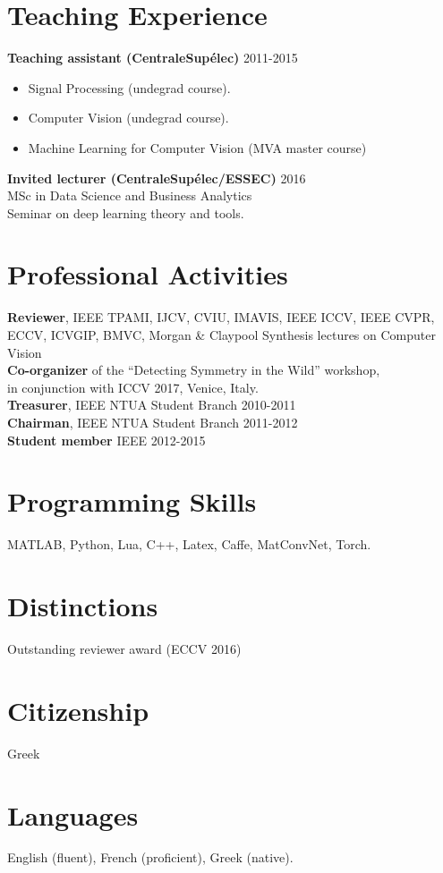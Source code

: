\documentclass[margin]{res}
\begin{document}
\begin{resume}
\section{Teaching Experience} 
	\textbf{Teaching assistant (CentraleSup\'elec)}   \hfill 2011-2015 
	\begin{itemize}
		\item Signal Processing  (undegrad course).  
		\item Computer Vision  (undegrad course).
		\item Machine Learning for Computer Vision (MVA master course)
	\end{itemize}
	\textbf{Invited lecturer (CentraleSup\'elec/ESSEC)} \hfill 2016 \\
	MSc in Data Science and Business Analytics \\
	Seminar on deep learning theory and tools.


\section{Professional Activities} 
	\textbf{Reviewer}, IEEE TPAMI, IJCV, CVIU, IMAVIS, IEEE ICCV, IEEE CVPR, ECCV, 
	ICVGIP, BMVC, Morgan \& Claypool Synthesis lectures on Computer Vision \\
	\textbf{Co-organizer} of the ``Detecting Symmetry in the Wild'' workshop, \\
	in conjunction with ICCV 2017, Venice, Italy. \\
	\textbf{Treasurer}, IEEE NTUA Student Branch \hfill 2010-2011 \\
	\textbf{Chairman}, IEEE NTUA Student Branch \hfill 2011-2012 \\
	\textbf{Student member} IEEE \hfill 2012-2015

\section{Programming Skills} MATLAB, Python, Lua, C++, Latex, Caffe, MatConvNet, Torch. 
\newline

\section{Distinctions} Outstanding reviewer award (ECCV 2016)
\section{Citizenship} Greek
\section{Languages} English (fluent), French (proficient), Greek (native).
 
\end{resume}
\end{document}
